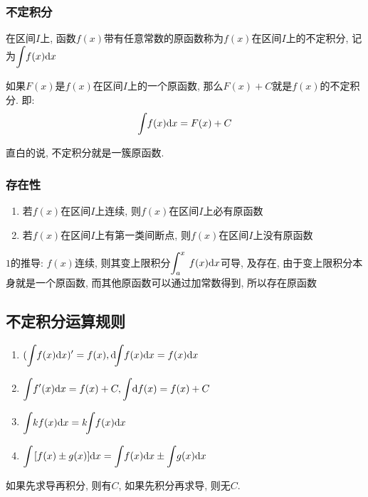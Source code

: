 \subsubsection{不定积分}
在区间$ I $上, 函数$ f(x) $带有任意常数的原函数称为$ f(x) $在区间$ I $上的不定积分, 记为$ \displaystyle \int_{}\hspace{.2em} f(x)\mathrm{d}x $ \par 如果$ F(x) $是$ f(x) $在区间$ I $上的一个原函数, 那么$ F(x)+C $就是$ f(x) $的不定积分. 即:
\begin{equation*}
\displaystyle\int_{}\hspace{.2em} f(x)\mathrm{d}x =F(x)+C
\end{equation*}\par
直白的说, 不定积分就是一簇原函数.
\subsubsection{存在性}
\begin{enumerate}
\item 若$ f(x) $在区间$ I $上连续, 则$ f(x) $在区间$ I $上必有原函数
\item 若$ f(x) $在区间$ I $上有第一类间断点, 则$ f(x)
 $在区间$ I $上没有原函数
\end{enumerate}
\begin{tcolorbox}
$ 1 $的推导: $ f(x) $连续, 则其变上限积分$ \displaystyle\int_{a}^{x}\hspace{.2em}f(x)\mathrm{d}x $可导, 及存在, 由于变上限积分本身就是一个原函数, 而其他原函数可以通过加常数得到, 所以存在原函数
\end{tcolorbox}
\subsection{不定积分运算规则}
\begin{enumerate}
\item $ (\displaystyle\int_{}\hspace{.2em} f(x)\mathrm{d}x)'=f(x), \mathrm{d}\hspace{-.35em}\displaystyle\int_{}\hspace{.2em} f(x)\mathrm{d}x=f(x)\mathrm{d}x $
\item $ \displaystyle\int_{}\hspace{.2em} f'(x)\mathrm{d}x=f(x)+C, \displaystyle\int_{}\hspace{.2em} \mathrm{d}f(x)=f(x)+C $
\item $ \displaystyle\int_{}\hspace{.2em} kf(x)\mathrm{d}x=k\hspace{-.35em}\displaystyle\int_{}\hspace{.2em} f(x)\mathrm{d}x $
\item $ \displaystyle\int_{}\hspace{.5em} [f(x)\pm g(x)]\mathrm{d}x=\displaystyle\int_{}\hspace{.2em} f(x)\mathrm{d}x\pm \displaystyle\int_{}\hspace{.2em} g(x)\mathrm{d}x $
\end{enumerate}\par
如果先求导再积分, 则有$ C $, 如果先积分再求导, 则无$ C $.
